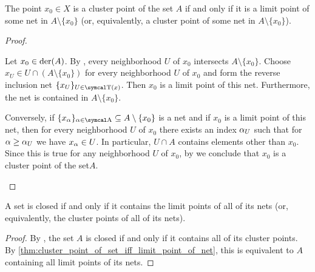 \begin{proposition}\label{thm:cluster_point_of_set_iff_limit_point_of_net}
  The point \( x_0 \in X \) is a cluster point of the set \( A \) if and only if it is a limit point of some net in \( A \setminus \{ x_0 \} \) (or, equivalently, a cluster point of some net in \( A \setminus \{ x_0 \} \)).
\end{proposition}
\begin{proof}\mbox{}
  \begin{description}
    \Implies Let \( x_0 \in \operatorname{der}(A) \). By , every neighborhood \( U \) of \( x_0 \) intersects \( A \setminus \{ x_0 \} \). Choose\LEM \( x_U \in U \cap (A \setminus \{ x_0 \}) \) for every neighborhood \( U \) of \( x_0 \) and form the reverse inclusion net \( \{ x_U \}_{U \in \CT(x)} \). Then \( x_0 \) is a limit point of this net. Furthermore, the net is contained in \( A \setminus \{ x_0 \} \).

    \ImpliedBy Conversely, if \( \{ x_\al \}_{\al \in \CA} \subseteq A \setminus \{ x_0 \} \) is a net and if \( x_0 \) is a limit point of this net, then for every neighborhood \( U \) of \( x_0 \) there exists an index \( \alpha_U \) such that for \( \alpha \geq \alpha_U \) we have \(  x_\alpha \in U \). In particular, \( U \cap A \) contains elements other than \( x_0 \). Since this is true for any neighborhood \( U \) of \( x_0 \), by  we conclude that \( x_0 \) is a cluster point of the set\( A \).
  \end{description}
\end{proof}

\begin{corollary}\label{thm:closed_iff_contains_all_net_cluster_points}
  A set is closed if and only if it contains the limit points of all of its nets (or, equivalently, the cluster points of all of its nets).
\end{corollary}
\begin{proof}
  By , the set \( A \) is closed if and only if it contains all of its cluster points. By \cref{thm:cluster_point_of_set_iff_limit_point_of_net}, this is equivalent to \( A \) containing all limit points of its nets.
\end{proof}

